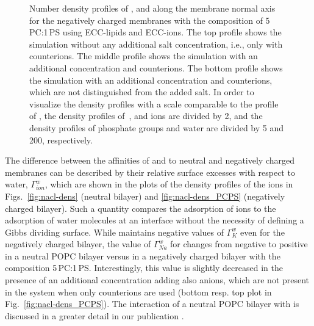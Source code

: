 \documentclass[journal=jpcbfk,manuscript=article]{achemso}
\begin{document}
\begin{figure}[tbp!]
{    Number density profiles of ,  and  along the membrane normal axis 
    for the negatively charged membranes with the composition of 5\,PC:1\,PS using ECC-lipids and ECC-ions.  
    The top profile shows the simulation without any additional salt concentration, i.e., only with  counterions. 
    The middle profile shows the simulation with an additional  concentration and  counterions. 
    The bottom profile shows the simulation with an additional  concentration and  counterions, which are not distinguished from the added salt. 
    In order to visualize the density profiles with a scale comparable to the profile of , 
    the density profiles of~,  and  ions are divided by 2, and 
    the density profiles of phosphate groups and water are divided by 5 and 200, respectively.  
    } 
\end{figure} 



The difference between the affinities of  and  to neutral and negatively charged membranes
can be described by their relative surface excesses with respect to water, $\Gamma ^{w} _{ion}$, 
which are shown in the plots of the density profiles of the ions in Figs.~\ref{fig:nacl-dens} (neutral bilayer) and \ref{fig:nacl-dens_PCPS} (negatively charged bilayer). 
Such a quantity compares the adsorption of ions to the adsorption of water molecules at an interface 
without the necessity of defining a Gibbs dividing surface. \citep{melcr18, chattorajBOOK}
While  maintains negative values of $\Gamma^{w}_{K}$ even for the negatively charged bilayer,
the value of $\Gamma^{w}_{Na}$ for  changes from negative to positive
in a neutral POPC bilayer versus in a negatively charged bilayer with the composition 5\,PC:1\,PS.
Interestingly, this value is slightly decreased in the presence of an additional  concentration adding also  anions, 
which are not present in the system when only counterions are used
(bottom resp. top plot in Fig.~\ref{fig:nacl-dens_PCPS}). 
The interaction of a neutral POPC bilayer with  is discussed in a greater detail in our publication \citep{melcr18}. 

 





 
 
\end{document}
